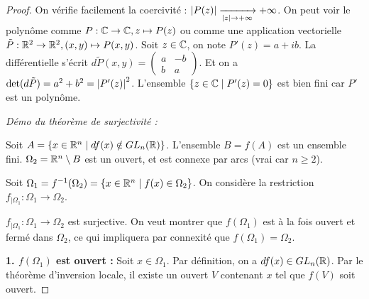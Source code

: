 \begin{proof}
    On vérifie facilement la coercivité : $\left|P(z)\right| \xrightarrow[\left|z\right| \to +\infty]{} +\infty$.
    On peut voir le polynôme comme $P : \mathbb{C} \to \mathbb{C}, z \mapsto P(z)$ ou comme une application vectorielle $\tilde{P} : \mathbb{R}^2 \to \mathbb{R}^2, (x,y) \mapsto P(x,y)$.
    Soit $z \in \mathbb{C}$, on note $P'(z) = a + i b$.
    La différentielle s'écrit $d\tilde{P}(x,y) = \begin{pmatrix} a & -b \\ b & a \end{pmatrix}$.
    Et on a $\det(d\tilde{P}) = a^2 + b^2 = \left|P'(z)\right|^2$.
    L'ensemble $\{z \in \mathbb{C} \mid P'(z) = 0\}$ est bien fini car $P'$ est un polynôme.

    \lvspace
    \emph{Démo du théorème de surjectivité :}
    
    Soit $A = \{x \in \mathbb{R}^n \mid df(x) \notin GL_n(\mathbb{R})\}$. L'ensemble $B = f(A)$ est un ensemble fini.
    $\Omega_2 = \mathbb{R}^n \setminus B$ est un ouvert, et est connexe par arcs (vrai car $n \ge 2$).

    \begin{center}
    \end{center}

    Soit $\Omega_1 = f^{-1}(\Omega_2) = \{x \in \mathbb{R}^n \mid f(x) \in \Omega_2\}$.
    On considère la restriction $f_{|\Omega_1} : \Omega_1 \to \Omega_2$.

     $f_{|\Omega_1} : \Omega_1 \to \Omega_2$ est surjective.
    On veut montrer que $f(\Omega_1)$ est à la fois ouvert et fermé dans $\Omega_2$, ce qui impliquera par connexité que $f(\Omega_1) = \Omega_2$.

    \textbf{1. $f(\Omega_1)$ est ouvert :}
    Soit $x \in \Omega_1$. Par définition, on a $df(x) \in GL_n(\mathbb{R})$.
    Par le théorème d'inversion locale, il existe un ouvert $V$ contenant $x$ tel que $f(V)$ soit ouvert.


\end{proof}

